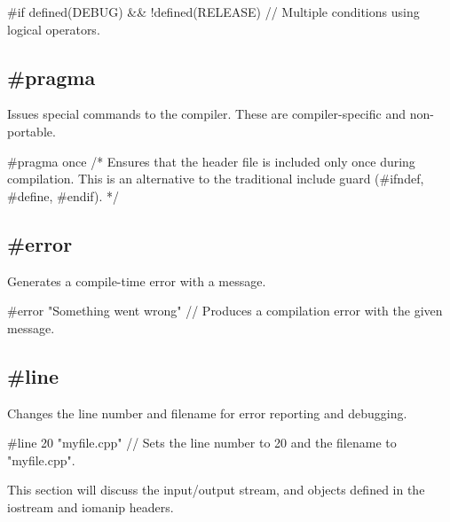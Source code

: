 \documentclass{report}
\begin{document}
    \begin{cppcode}
#if defined(DEBUG) && !defined(RELEASE) // Multiple conditions using logical operators.
    \end{cppcode}
    

    \bigbreak \noindent 
    \subsection{\#pragma}
    \bigbreak \noindent 
    Issues special commands to the compiler. These are compiler-specific and non-portable.
    \bigbreak \noindent 
    
    \begin{cppcode}
#pragma once 
/* Ensures that the header file is included only once during compilation. 
This is an alternative to the traditional include guard (#ifndef, #define, #endif). */
    \end{cppcode}
    

    \bigbreak \noindent 
    \subsection{\#error}
    \bigbreak \noindent 
    Generates a compile-time error with a message.
    \bigbreak \noindent 
    
    \begin{cppcode}
#error "Something went wrong" // Produces a compilation error with the given message.
    \end{cppcode}
    

    \bigbreak \noindent 
    \subsection{\#line}
    \bigbreak \noindent 
    Changes the line number and filename for error reporting and debugging.
    \bigbreak \noindent 
    
    \begin{cppcode}
#line 20 "myfile.cpp" // Sets the line number to 20 and the filename to "myfile.cpp".
    \end{cppcode}
    

    \pagebreak
    \bigbreak \noindent 
    This section will discuss the input/output stream, and objects defined in the iostream and iomanip headers.
    \bigbreak \noindent 
\end{document}
